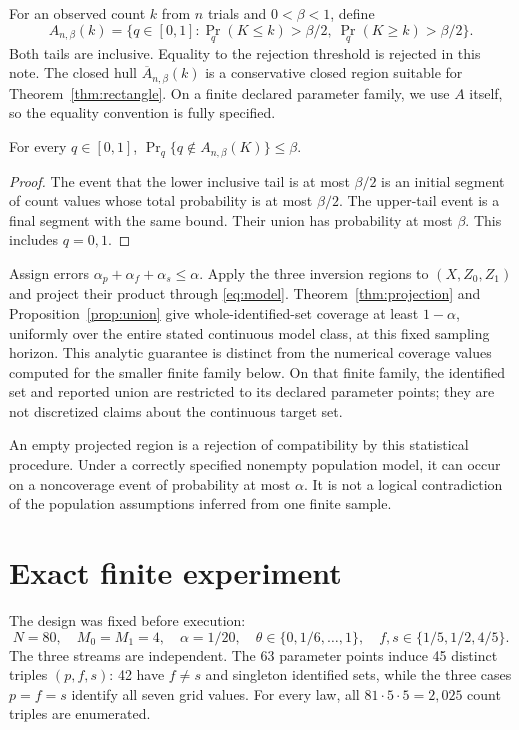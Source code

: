 \documentclass[11pt,a4paper]{article}
\theoremstyle{definition}\newtheorem{definition}[theorem]{Definition}
\begin{document}
For an observed count $k$ from $n$ trials and $0<\beta<1$, define
\[
A_{n,\beta}(k)=\{q\in[0,1]:\Pr_q(K\le k)>\beta/2,\ \Pr_q(K\ge k)>\beta/2\}.
\]
Both tails are inclusive. Equality to the rejection threshold is rejected in this note. The closed hull $\overline A_{n,\beta}(k)$ is a conservative closed region suitable for Theorem~\ref{thm:rectangle}. On a finite declared parameter family, we use $A$ itself, so the equality convention is fully specified.

\begin{lemma}\label{lem:tails}
For every $q\in[0,1]$, $\Pr_q\{q\notin A_{n,\beta}(K)\}\le\beta$.
\end{lemma}
\begin{proof}
The event that the lower inclusive tail is at most $\beta/2$ is an initial segment of count values whose total probability is at most $\beta/2$. The upper-tail event is a final segment with the same bound. Their union has probability at most $\beta$. This includes $q=0,1$.
\end{proof}

Assign errors $\alpha_p+\alpha_f+\alpha_s\le\alpha$. Apply the three inversion regions to $(X,Z_0,Z_1)$ and project their product through \eqref{eq:model}. Theorem~\ref{thm:projection} and Proposition~\ref{prop:union} give whole-identified-set coverage at least $1-\alpha$, uniformly over the entire stated continuous model class, at this fixed sampling horizon. This analytic guarantee is distinct from the numerical coverage values computed for the smaller finite family below. On that finite family, the identified set and reported union are restricted to its declared parameter points; they are not discretized claims about the continuous target set.

An empty projected region is a rejection of compatibility by this statistical procedure. Under a correctly specified nonempty population model, it can occur on a noncoverage event of probability at most $\alpha$. It is not a logical contradiction of the population assumptions inferred from one finite sample.

\section{Exact finite experiment}\label{sec:enumeration}

The design was fixed before execution:
\[
N=80,\quad M_0=M_1=4,\quad \alpha=1/20,\quad
\theta\in\{0,1/6,\ldots,1\},\quad f,s\in\{1/5,1/2,4/5\}.
\]
The three streams are independent. The 63 parameter points induce 45 distinct triples $(p,f,s)$: 42 have $f\ne s$ and singleton identified sets, while the three cases $p=f=s$ identify all seven grid values. For every law, all $81\cdot5\cdot5=2{,}025$ count triples are enumerated.
\end{document}
